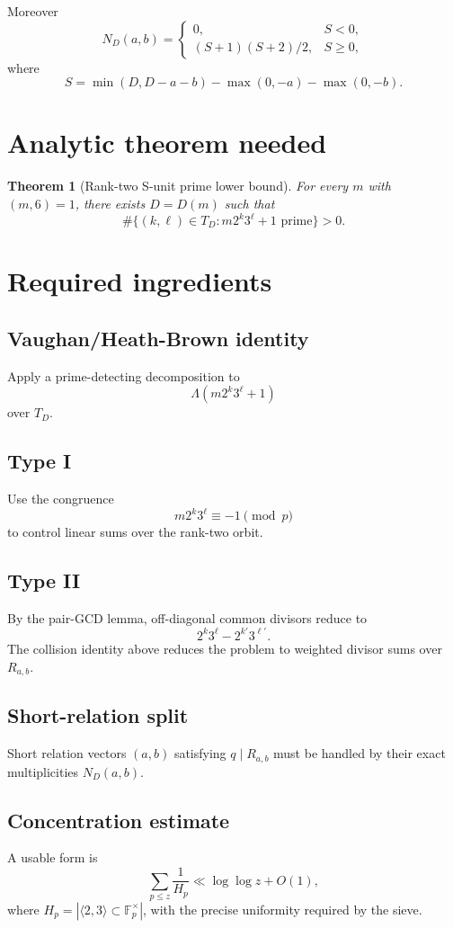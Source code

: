 \documentclass[11pt]{article}
\newtheorem{theorem}{Theorem}
\begin{document}
Moreover
\[
N_D(a,b)=
\begin{cases}
0,& S<0,\\
(S+1)(S+2)/2,& S\ge 0,
\end{cases}
\]
where
\[
S=\min(D,D-a-b)-\max(0,-a)-\max(0,-b).
\]

\section{Analytic theorem needed}

\begin{theorem}[Rank-two S-unit prime lower bound]
For every \(m\) with \((m,6)=1\), there exists \(D=D(m)\) such that
\[
\#\{(k,\ell)\in T_D:m2^k3^\ell+1\text{ prime}\}>0.
\]
\end{theorem}

\section{Required ingredients}

\subsection{Vaughan/Heath-Brown identity}
Apply a prime-detecting decomposition to
\[
\Lambda(m2^k3^\ell+1)
\]
over \(T_D\).

\subsection{Type I}
Use the congruence
\[
m2^k3^\ell\equiv -1\pmod p
\]
to control linear sums over the rank-two orbit.

\subsection{Type II}
By the pair-GCD lemma, off-diagonal common divisors reduce to
\[
2^k3^\ell-2^{k'}3^{\ell'}.
\]
The collision identity above reduces the problem to weighted divisor sums over
\(R_{a,b}\).

\subsection{Short-relation split}
Short relation vectors \((a,b)\) satisfying \(q\mid R_{a,b}\) must be handled
by their exact multiplicities \(N_D(a,b)\).

\subsection{Concentration estimate}
A usable form is
\[
\sum_{p\le z}\frac{1}{H_p}\ll \log\log z+O(1),
\]
where \(H_p=|\langle 2,3\rangle\subset\mathbb F_p^\times|\), with the precise
uniformity required by the sieve.
\end{document}

